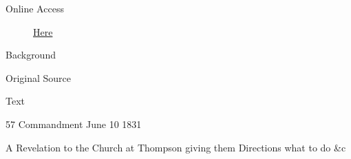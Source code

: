 			\begin{description}
				\item[Online Access] \href{https://www.josephsmithpapers.org/paper-summary/revelation-10-june-1831-dc-54/1}{Here}
			\end{description}
			
			\begin{description}
				\item[Background]
			\end{description}
			
			
			\begin{description}
				\item[Original Source]
			\end{description}
			
			
			\begin{description}
				\item[Text]
			\end{description}
			
				\begin{tightcenter}
				57 Commandment June 10 1831
				\end{tightcenter}
				
				A Revelation to the Church at Thompson giving them Directions what to do \&c
				
